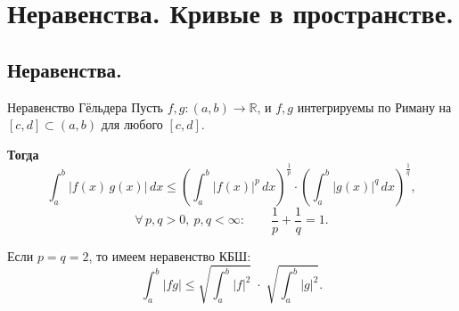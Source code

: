 
\section{Неравенства. Кривые в пространстве.}

\subsection{Неравенства.}

\begin{Theorem}{Неравенство Гёльдера}{}
	Пусть $f,g:(a,b)\to\mathbb{R}$, и $f,g$ интегрируемы по Риману на $[c,d]\subset(a,b)$ для любого $[c,d]$.
	
	\medskip
	\textbf{Тогда}
	\[
	\int_a^b \bigl|f(x)\,g(x)\bigr|\,dx
	\le
	\left(\int_a^b |f(x)|^{p}\,dx\right)^{\!\frac1p}
	\cdot
	\left(\int_a^b |g(x)|^{q}\,dx\right)^{\!\frac1q},
	\]
	\[
	\forall\, p,q>0,\ p,q<\infty:\qquad \frac1p+\frac1q=1.
	\]
	
	\medskip
	Если $p=q=2$, то имеем неравенство КБШ:
	\[
	\int_a^b |fg|
	\le
	\sqrt{\int_a^b |f|^{2}}\;\cdot\;\sqrt{\int_a^b |g|^{2}}.
	\]
\end{Theorem}

